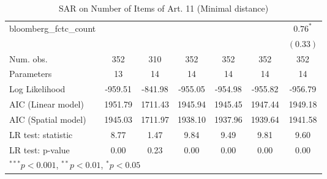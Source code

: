 \begin{table}[!h]
\begin{center}
\begin{tabular}{l c c c c c c }
bloomberg\_fctc\_count  &              &              &              &              &              & $0.76^{*}$   \\
                        &              &              &              &              &              & $(0.33)$     \\
\midrule
Num. obs.               & 352          & 310          & 352          & 352          & 352          & 352          \\
Parameters              & 13           & 14           & 14           & 14           & 14           & 14           \\
Log Likelihood          & -959.51      & -841.98      & -955.05      & -954.98      & -955.82      & -956.79      \\
AIC (Linear model)      & 1951.79      & 1711.43      & 1945.94      & 1945.45      & 1947.44      & 1949.18      \\
AIC (Spatial model)     & 1945.03      & 1711.97      & 1938.10      & 1937.96      & 1939.64      & 1941.58      \\
LR test: statistic      & 8.77         & 1.47         & 9.84         & 9.49         & 9.81         & 9.60         \\
LR test: p-value        & 0.00         & 0.23         & 0.00         & 0.00         & 0.00         & 0.00         \\
\bottomrule
\multicolumn{7}{l}{\scriptsize{$^{***}p<0.001$, $^{**}p<0.01$, $^*p<0.05$}}
\end{tabular}
\caption{SAR on Number of Items of Art. 11 (Minimal distance)}
\label{table:coefficients}
\end{center}
\end{table}
